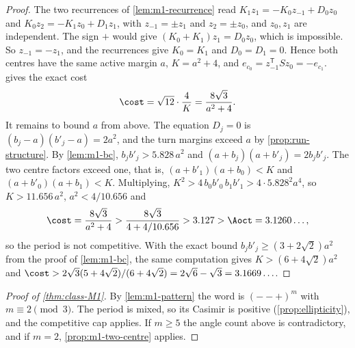 \begin{proof}
  The two recurrences of \cref{lem:m1-recurrence} read $K_1z_1=-K_0z_{-1}+D_0z_0$ and
  $K_0z_2=-K_1z_0+D_1z_1$, with $z_{-1}=\pm z_1$ and $z_2=\pm z_0$, and $z_0,z_1$ are independent.
  The sign $+$ would give $(K_0+K_1)z_1=D_0z_0$, which is impossible. So $z_{-1}=-z_1$, and the
  recurrences give $K_0=K_1$ and $D_0=D_1=0$. Hence both centres have the same active margin $a$,
  $K=a^2+4$, and $e_{c_0}=z_{-1}^{\mathsf T}Sz_0=-e_{c_1}$.  gives the exact
  cost
  \[
    \cost=\sqrt{12}\cdot\frac 4K=\frac{8\sqrt3}{a^2+4}.
  \]
  It remains to bound $a$ from above. The equation $D_j=0$ is $(b_j-a)(b'_j-a)=2a^2$, and the
  turn margins exceed $a$ by \cref{prop:run-structure}. By \cref{lem:m1-bc},
  $b_jb'_j>5.828\,a^2$ and $(a+b_j)(a+b'_j)=2b_jb'_j$. The two centre factors exceed one,
  that is, $(a+b'_1)(a+b_0)<K$ and $(a+b'_0)(a+b_1)<K$. Multiplying,
  $K^2>4\,b_0b'_0\,b_1b'_1>4\cdot5.828^2a^4$, so $K>11.656\,a^2$, $a^2<4/10.656$ and
  \[
    \cost=\frac{8\sqrt3}{a^2+4}>\frac{8\sqrt3}{4+4/10.656}>3.127>\Aoct=3.1260\ldots,
  \]
  so the period is not competitive. With the exact bound $b_jb'_j\ge(3+2\sqrt2)a^2$ from the proof
  of \cref{lem:m1-bc}, the same computation gives $K>(6+4\sqrt2)a^2$ and
  $\cost>2\sqrt3(5+4\sqrt2)/(6+4\sqrt2)=2\sqrt6-\sqrt3=3.1669\ldots$.
\end{proof}

\begin{proof}[Proof of \cref{thm:class-M1}]
  By \cref{lem:m1-pattern} the word is $(--+)^m$ with $m\equiv2\pmod3$. The period is mixed, so its
  Casimir is positive (\cref{prop:ellipticity}), and the competitive cap applies. If $m\ge5$ the
  angle count above is contradictory, and if $m=2$, \cref{prop:m1-two-centre} applies.
\end{proof}

